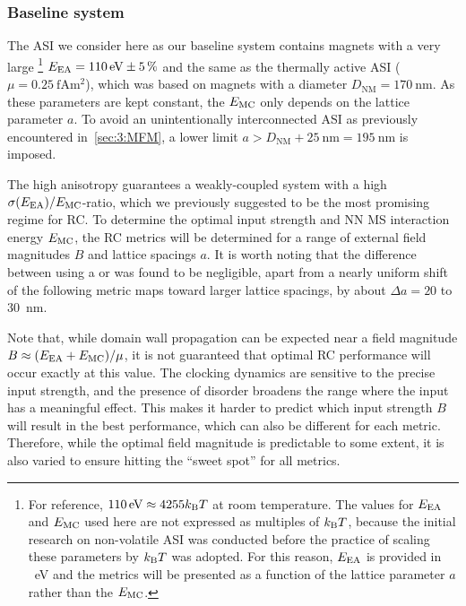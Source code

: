\subsubsection{Baseline system}
The ASI we consider here as our baseline system contains magnets with a very large \footnote{
	For reference, $\SI{110}{\electronvolt} \approx 4255\kBT$ at room temperature.
	The values for $E_\mathrm{EA}$ and $E_\mathrm{MC}$ used here are not expressed as multiples of $\kBT$, because the initial research on non-volatile ASI was conducted before the practice of scaling these parameters by $\kBT$ was adopted.
	For this reason, $E_\mathrm{EA}$ is provided in \SI{}{\electronvolt} and the metrics will be presented as a function of the lattice parameter $a$ rather than the  $E_\mathrm{MC}$.
} $E_\mathrm{EA} = \SI{110}{\electronvolt} \pm \SI{5}{\percent}$ and the same  as the thermally active ASI ($\mu = \SI{0.25}{\femto\ampere\metre\squared}$), which was based on magnets with a diameter $D_\mathrm{NM} = \SI{170}{\nano\metre}$.
As these parameters are kept constant, the  $E_\mathrm{MC}$ only depends on the lattice parameter $a$.
To avoid an unintentionally interconnected ASI as previously encountered in~\cref{sec:3:MFM}, a lower limit $a > D_\mathrm{NM} + \SI{25}{\nano\metre} = \SI{195}{\nano\metre}$ is imposed. \par
The high anisotropy guarantees a weakly-coupled system with a high $\sigma(E_\mathrm{EA})/E_\mathrm{MC}$-ratio, which we previously suggested to be the most promising regime for RC.
To determine the optimal input strength and NN MS interaction energy $E_\mathrm{MC}$, the RC metrics will be determined for a range of external field magnitudes $B$ and lattice spacings $a$.
It is worth noting that the difference between using a  or  was found to be negligible, apart from a nearly uniform shift of the following metric maps toward larger lattice spacings, by about $\Delta a = 20$ to \SI{30}{\nano\metre}. \par %
Note that, while domain wall propagation can be expected near a field magnitude $B \approx (E_\mathrm{EA} + E_\mathrm{MC})/\mu$, it is not guaranteed that optimal RC performance will occur exactly at this value.
The clocking dynamics are sensitive to the precise input strength, and the presence of disorder broadens the range where the input has a meaningful effect.
This makes it harder to predict which input strength $B$ will result in the best performance, which can also be different for each metric.
Therefore, while the optimal field magnitude is predictable to some extent, it is also varied to ensure hitting the ``sweet spot'' for all metrics.

